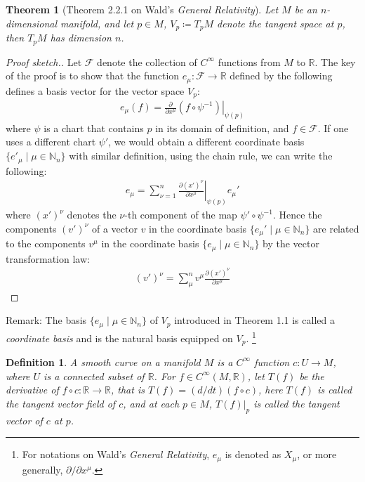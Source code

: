 \documentclass[11pt, onesided]{book}
\theoremstyle{break}
\theoremstyle{break}
\newtheorem{thm}{Theorem}[section]
\newtheorem{defn}{Definition}[thm]
\newcommand{\R}{\mathbb{R}}
\newcommand{\N}{\mathbb{N}}
\newcommand{\pd}{\partial}
\newcommand{\txt}{Wald's \textit{General Relativity}}
\newcommand{\remark}{\color{blue}Remark: \color{black}}
\begin{document}
\begin{thm}[Theorem 2.2.1 on \txt]
Let $M$ be an $n$-dimensional manifold, and let $p \in M$, $V_p\coloneqq T_pM$ denote the tangent space at $p$, then $T_pM$ has dimension $n$.
\end{thm}
\begin{proof}[Proof sketch.]
Let $\mathcal{F}$ denote the collection of $C^\infty$  functions from $M$ to $\R$. The key of the proof is to show that the function $e_\mu: \mathcal{F}\to \R$ defined by the following defines a basis vector for the vector space $V_p$:
\begin{align*}
e_\mu(f) = \left.\frac{\pd}{\pd x^\mu}(f \circ  \psi^{-1})\right|_{\psi(p)}
\end{align*}
where $\psi$ is a chart that contains $p$ in its domain of definition, and $f \in \mathcal{F}$. If one uses a different chart $\psi'$, we would obtain a different coordinate basis $\{e'_\mu \mid \mu \in \N_n\}$ with similar definition, using the chain rule, we can write the following:
\begin{align*}
e_\mu = \sum_{\nu=1}^n \left.\frac{\pd (x')^\nu}{\pd x^\mu}\right|_{\psi(p)}e_\mu'
\end{align*}
where $(x')^\nu$ denotes the $\nu$-th component of the map $\psi'\circ \psi^{-1}$. Hence the components $(v')^\nu$ of a vector $v$ in the coordinate basis $\{e_\mu'\mid \mu\in \N_n\}$ are related to the components $v^\mu$ in the coordinate basis $\{e_\mu\mid \mu\in \N_n\}$ by the vector transformation law:
\begin{align}
(v')^\nu = \sum_{\mu}^n v^\mu \frac{\pd (x')^\nu }{\pd x^\mu}
\end{align}
\end{proof}

\remark The basis $\{e_\mu\mid \mu \in \N_n\}$ of $V_p$ introduced in Theorem 1.1 is called a \textit{coordinate basis} and is the natural basis equipped on $V_p$. \footnote{For notations on \txt, $e_\mu$ is denoted as $X_\mu$, or more generally, $\pd/\pd x^\mu$. }\\

\begin{defn}
A smooth curve on a manifold $M$ is a $C^\infty$ function $c:U \to M$, where $U$ is a connected subset of $\R$. For $f \in C^\infty(M, \R)$, let $T(f)$ be the derivative of $f\circ c:\R \to \R$, that is $T(f) = (d/dt)(f\circ c)$, here $T(f)$ is called the tangent vector field of $c$, and at each $p \in M$, $T(f)|_p$ is called the tangent vector of $c$ at $p$.
\end{defn}
\end{document}
